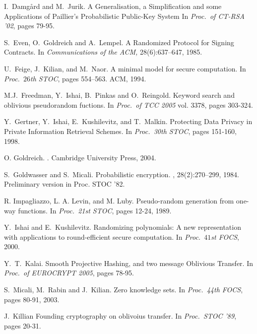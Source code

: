 \documentclass[11pt]{article}
\begin{document}
\begin{footnotesize}
\begin{thebibliography}{10}
		I.~Damg{\aa}rd and M.~Jurik.
		\newblock A Generalisation, a Simplification and some Applications of Paillier's Probabilistic Public-Key System
		\newblock In {\em Proc.\ of CT-RSA '02}, pages 79-95.
		
		S.~Even, O.~Goldreich and A.~Lempel.
		\newblock A Randomized Protocol for Signing Contracts.
		\newblock In {\em Communications of the ACM,} 28(6):637--647, 1985.
		
		U.~Feige, J.~Kilian, and M.~Naor.
		\newblock A minimal model for secure computation.
		\newblock In {\em Proc.\ $26$th STOC}, pages 554--563. ACM, 1994.
		
		M.J.~Freedman, Y.~Ishai, B.~Pinkas and O.~Reingold.
		\newblock Keyword search and oblivious pseudorandom fuctions.
		\newblock In {\em Proc.\ of TCC 2005} vol. 3378, pages 303-324.
		
		Y.~Gertner, Y.~Ishai, E.~Kushilevitz, and T.~Malkin.
		\newblock Protecting Data Privacy in Private Information Retrieval Schemes.
		\newblock In {\em Proc.\ 30th STOC}, pages 151-160, 1998.
		
		
		 O. Goldreich.  .  \newblock Cambridge University
		Press, 2004.
		
		S.~Goldwasser and S.~Micali.
		\newblock Probabilistic encryption.
		, 28(2):270--299, 1984.
		\newblock Preliminary version in Proc. STOC '82.
		
		R. Impagliazzo, L. A. Levin, and M. Luby.
		\newblock Pseudo-random generation from one-way functions.
		\newblock In {\em Proc.\ 21st STOC}, pages 12-24, 1989.
		
		Y.~Ishai and E.~Kushilevitz.
		\newblock Randomizing polynomials: A new representation with applications to round-efficient secure computation.
		\newblock In {\em Proc.\ $41$st FOCS}, 2000.
		
		Y.~T.~Kalai.
		\newblock Smooth Projective Hashing, and two message Oblivious Transfer.
		\newblock In {\em Proc.\ of EUROCRYPT 2005}, pages 78-95.
		
		S.~Micali, M.~Rabin and J.~Kilian.
		\newblock Zero knowledge sets.
		\newblock In {\em Proc.\ 44th FOCS}, pages 80-91, 2003.
		
		J.~Killian
		\newblock Founding cryptography on oblivoius transfer.
		\newblock In {\em Proc.\ STOC '89}, pages 20-31.
		

\end{thebibliography}
\end{footnotesize}
\end{document}
